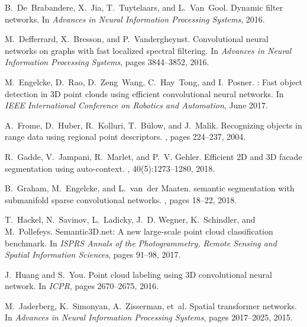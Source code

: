 \documentclass[10pt,twocolumn,letterpaper]{article}
\begin{document}
{\begin{thebibliography}{10}
B.~De~Brabandere, X.~Jia, T.~Tuytelaars, and L.~Van~Gool.
\newblock Dynamic filter networks.
\newblock In {\em Advances in Neural Information Processing Systems}, 2016.

M.~Defferrard, X.~Bresson, and P.~Vandergheynst.
\newblock Convolutional neural networks on graphs with fast localized spectral
  filtering.
\newblock In {\em Advances in Neural Information Processing Systems}, pages
  3844--3852, 2016.

M.~Engelcke, D.~Rao, D.~Zeng~Wang, C.~Hay~Tong, and I.~Posner.
: Fast object detection in {3D} point clouds using
  efficient convolutional neural networks.
\newblock In {\em IEEE International Conference on Robotics and Automation},
  June 2017.

A.~Frome, D.~Huber, R.~Kolluri, T.~B{\"u}low, and J.~Malik.
\newblock Recognizing objects in range data using regional point descriptors.
, pages 224--237, 2004.

R.~Gadde, V.~Jampani, R.~Marlet, and P.~V. Gehler.
\newblock Efficient {2D} and {3D} facade segmentation using auto-context.
,
  40(5):1273--1280, 2018.

B.~Graham, M.~Engelcke, and L.~van~der Maaten.
 semantic segmentation with submanifold sparse convolutional
  networks.
, pages 18--22, 2018.

T.~Hackel, N.~Savinov, L.~Ladicky, J.~D. Wegner, K.~Schindler, and
  M.~Pollefeys.
\newblock Semantic{3D}.net: A new large-scale point cloud classification
  benchmark.
\newblock In {\em ISPRS Annals of the Photogrammetry, Remote Sensing and
  Spatial Information Sciences}, pages 91--98, 2017.

J.~Huang and S.~You.
\newblock Point cloud labeling using {3D} convolutional neural network.
\newblock In {\em ICPR}, pages 2670--2675, 2016.

M.~Jaderberg, K.~Simonyan, A.~Zisserman, et~al.
\newblock Spatial transformer networks.
\newblock In {\em Advances in Neural Information Processing Systems}, pages
  2017--2025, 2015.


\end{thebibliography}}
\end{document}
